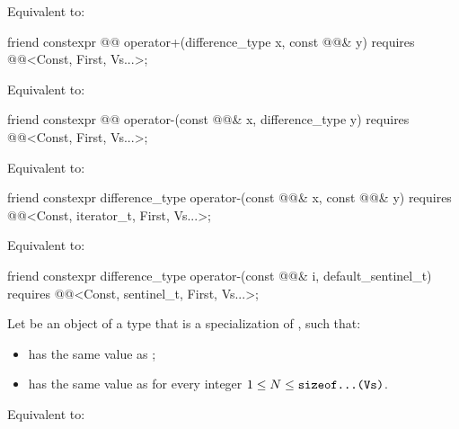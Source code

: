 \begin{itemdescr}
\pnum
\effects
Equivalent to: 
\end{itemdescr}

\begin{itemdecl}
friend constexpr @@ operator+(difference_type x, const @@& y)
  requires @@<Const, First, Vs...>;
\end{itemdecl}

\begin{itemdescr}
\pnum
\effects
Equivalent to: 
\end{itemdescr}

\begin{itemdecl}
friend constexpr @@ operator-(const @@& x, difference_type y)
  requires @@<Const, First, Vs...>;
\end{itemdecl}

\begin{itemdescr}
\pnum
\effects
Equivalent to: 
\end{itemdescr}

\begin{itemdecl}
friend constexpr difference_type operator-(const @@& x, const @@& y)
  requires @@<Const, iterator_t, First, Vs...>;
\end{itemdecl}

\begin{itemdescr}
\pnum
\effects
Equivalent to: 
\end{itemdescr}

\begin{itemdecl}
friend constexpr difference_type operator-(const @@& i, default_sentinel_t)
  requires @@<Const, sentinel_t, First, Vs...>;
\end{itemdecl}

\begin{itemdescr}
\pnum
Let  be an object of a type
that is a specialization of , such that:
\begin{itemize}
\item
{} has the same value as
;
\item
{} has the same value as
for every integer $1 \le N \le \texttt{\protect sizeof...(Vs)}$.
\end{itemize}

\pnum
\effects
Equivalent to: 
\end{itemdescr}

